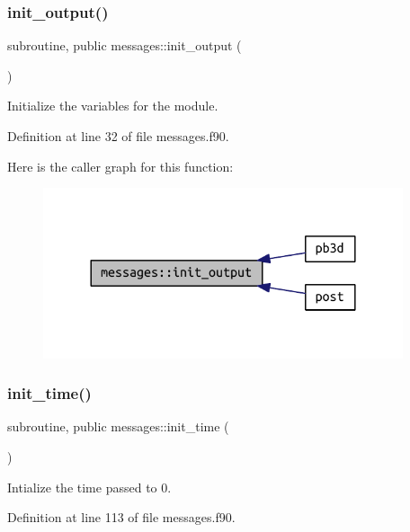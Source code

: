 \subsubsection{\texorpdfstring{init\+\_\+output()}{init\_output()}}
{\footnotesize\ttfamily subroutine, public messages\+::init\+\_\+output (\begin{DoxyParamCaption}{ }\end{DoxyParamCaption})}



Initialize the variables for the module. 



Definition at line 32 of file messages.\+f90.

Here is the caller graph for this function\+:\nopagebreak
\begin{figure}[H]
\begin{center}
\leavevmode
\includegraphics[width=300pt]{namespacemessages_a5e45296f088e9f31115a3b8d869f3177_icgraph}
\end{center}
\end{figure}
\mbox{\label{namespacemessages_a8ed785522aec7ac549263cdd54a8619a}} 
\subsubsection{\texorpdfstring{init\+\_\+time()}{init\_time()}}
{\footnotesize\ttfamily subroutine, public messages\+::init\+\_\+time (\begin{DoxyParamCaption}{ }\end{DoxyParamCaption})}



Intialize the time passed to 0. 



Definition at line 113 of file messages.\+f90.

